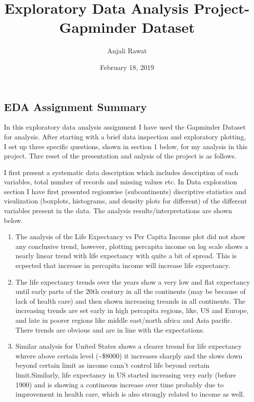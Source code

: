 \documentclass[]{article}
\title{Exploratory Data Analysis Project- Gapminder Dataset}
\author{Anjali Rawat}
\date{February 18, 2019}
\begin{document}
\maketitle

\subsection{EDA Assignment Summary}\label{eda-assignment-summary}

In this exploratory data analysis assignment I have used the Gapminder
Dataset for analysis. After starting with a brief data inspection and
exploratory plotting, I set up three specific questions, shown in
section 1 below, for my analysis in this project. Thre reset of the
presentation and anlysis of the project is as follows.

I first present a systematic data description which includes description
of each variables, total number of records and missing values etc. In
Data exploration section I have first presented regionwise
(subcontinents) discriptive statistics and visulization (boxplots,
histograms, and density plots for different) of the different variables
present in the data. The analysis results/interpretations are shown
below.

\begin{enumerate}
\def\labelenumi{\arabic{enumi})}
\item
  The analysis of the Life Expectancy vs Per Capita Income plot did not
  show any conclusive trend, however, plotting percapita income on log
  scale shows a nearly linear trend with life expectancy with quite a
  bit of spread. This is ecpected that increase in percapita income will
  increase life expectancy.
\item
  The life expectancy trends over the years show a very low and flat
  expectancy until early parts of the 20th century in all the continents
  (may be because of lack of health care) and then shown increasing
  treands in all continents. The increasing trends are set early in high
  percapita regions, like, US and Europe, and late in poorer regions
  like middle east/north africa and Asia pacific. There trends are
  obvious and are in line with the expectations.
\item
  Similar analysis for United States shows a clearer tresnd for life
  expectancy whrere above certain level (\textasciitilde{}\$8000) it
  increases sharply and the slows down beyond certain limit as income
  cann't control life beyond certain limit.Similarly, life expectancy in
  US started increasing very early (before 1900) and is showing a
  contineous increase over time probably due to improvement in health
  care, which is also strongly related to income as well.
\end{enumerate}
\end{document}
